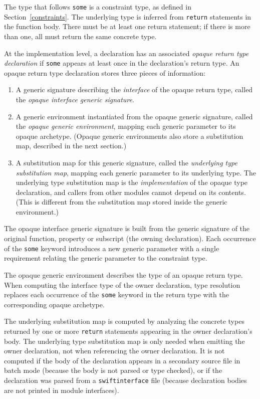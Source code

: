 \documentclass[a4paper,headsepline,bibliography=totoc,toc=flat,fleqn,twoside=semi]{scrbook}
\theoremstyle{definition}
\theoremstyle{definition}
\theoremstyle{definition}
\begin{document}
The type that follows \texttt{some} is a constraint type, as defined in Section~\ref{constraints}. The underlying type is inferred from \texttt{return} statements in the function body. There must be at least one return statement; if there is more than one, all must return the same concrete type.

At the implementation level, a declaration has an associated \emph{opaque return type declaration} if \texttt{some} appears at least once in the declaration's return type. An opaque return type declaration stores three pieces of information:
\begin{enumerate}
\item A generic signature describing the \emph{interface} of the opaque return type, called the \emph{opaque interface generic signature}.
\item A generic environment instantiated from the opaque generic signature, called the \emph{opaque generic environment}, mapping each generic parameter to its opaque archetype. (Opaque generic environments also store a substitution map, described in the next section.)
\item A substitution map for this generic signature, called the \emph{underlying type substitution map}, mapping each generic parameter to its underlying type. The underlying type substitution map is the \emph{implementation} of the opaque type declaration, and callers from other modules cannot depend on its contents. (This is different from the substitution map stored inside the generic environment.)
\end{enumerate}
The opaque interface generic signature is built from the generic signature of the original function, property or subscript (the owning declaration). Each occurrence of the \texttt{some} keyword introduces a new generic parameter with a single requirement relating the generic parameter to the constraint type.
 
The opaque generic environment describes the type of an opaque return type. When computing the interface type of the owner declaration, type resolution replaces each occurrence of the \texttt{some} keyword in the return type with the corresponding opaque archetype.

The underlying substitution map is computed by analyzing the concrete types returned by one or more \texttt{return} statements appearing in the owner declaration's body. The underlying type substitution map is only needed when emitting the owner declaration, not when referencing the owner declaration. It is not computed if the body of the declaration appears in a secondary source file in batch mode (because the body is not parsed or type checked), or if the declaration was parsed from a \texttt{swiftinterface} file (because declaration bodies are not printed in module interfaces).
\end{document}
